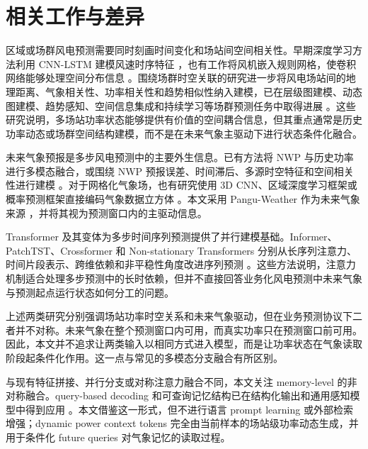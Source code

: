 \section{相关工作与差异}

区域或场群风电预测需要同时刻画时间变化和场站间空间相关性。早期深度学习方法利用 CNN-LSTM 建模风速时序特征 \cite{ref1}，也有工作将风机嵌入规则网格，使卷积网络能够处理空间分布信息 \cite{ref2}。围绕场群时空关联的研究进一步将风电场站间的地理距离、气象相关性、功率相关性和趋势相似性纳入建模，已在层级图建模、动态图建模、趋势感知、空间信息集成和持续学习等场群预测任务中取得进展 \cite{ref3,ref4,ref5,ref6,ref7,ref8,ref9,ref10,ref11,ref12}。这些研究说明，多场站功率状态能够提供有价值的空间耦合信息，但其重点通常是历史功率动态或场群空间结构建模，而不是在未来气象主驱动下进行状态条件化融合。

未来气象预报是多步风电预测中的主要外生信息。已有方法将 NWP 与历史功率进行多模态融合，或围绕 NWP 预报误差、时间滞后、多源时空特征和空间相关性进行建模 \cite{ref13,ref14,ref15,ref16,ref17,ref18}。对于网格化气象场，也有研究使用 3D CNN、区域深度学习框架或概率预测框架直接编码气象数据立方体 \cite{ref19,ref20,ref21}。本文采用 Pangu-Weather 作为未来气象来源 \cite{ref22}，并将其视为预测窗口内的主驱动信息。

Transformer 及其变体为多步时间序列预测提供了并行建模基础。Informer、PatchTST、Crossformer 和 Non-stationary Transformers 分别从长序列注意力、时间片段表示、跨维依赖和非平稳性角度改进序列预测 \cite{ref23,ref24,ref25,ref26}。这些方法说明，注意力机制适合处理多步预测中的长时依赖，但并不直接回答业务化风电预测中未来气象与预测起点运行状态如何分工的问题。

上述两类研究分别强调场站功率时空关系和未来气象驱动，但在业务预测协议下二者并不对称。未来气象在整个预测窗口内可用，而真实功率只在预测窗口前可用。因此，本文并不追求让两类输入以相同方式进入模型，而是让功率状态在气象读取阶段起条件化作用。这一点与常见的多模态分支融合有所区别。

与现有特征拼接、并行分支或对称注意力融合不同，本文关注 memory-level 的非对称融合。query-based decoding 和可查询记忆结构已在结构化输出和通用感知模型中得到应用 \cite{ref27,ref28,ref29}。本文借鉴这一形式，但不进行语言 prompt learning 或外部检索增强；dynamic power context tokens 完全由当前样本的场站级功率动态生成，并用于条件化 future queries 对气象记忆的读取过程。
